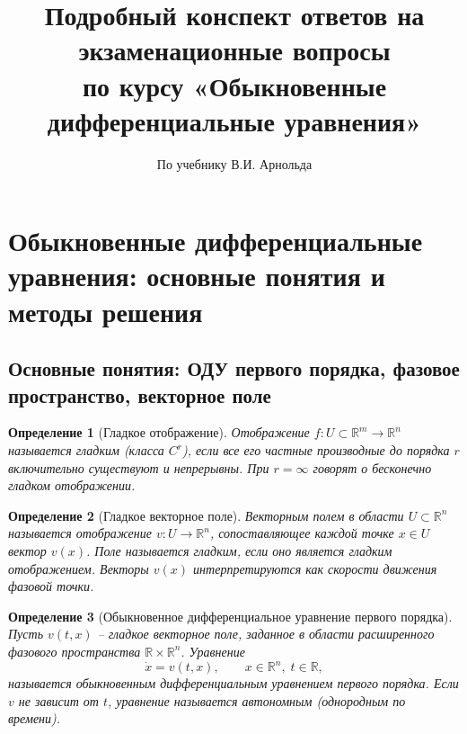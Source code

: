 \documentclass[a4paper,12pt]{article}
\newtheorem{definition}{Определение}
\theoremstyle{definition}
\begin{document}
\title{Подробный конспект ответов на экзаменационные вопросы\\
\large{по курсу «Обыкновенные дифференциальные уравнения»}}
\author{По учебнику В.И. Арнольда}
\date{}
\maketitle

\section{Обыкновенные дифференциальные уравнения: основные понятия и методы решения}

\subsection{Основные понятия: ОДУ первого порядка, фазовое пространство, векторное поле}

\begin{definition}[Гладкое отображение]
	Отображение $f:U\subset\mathbb{R}^m\to\mathbb{R}^n$ называется \emph{гладким} (класса $C^r$), если все его частные производные до порядка $r$ включительно существуют и непрерывны. При $r=\infty$ говорят о бесконечно гладком отображении.
\end{definition}

\begin{definition}[Гладкое векторное поле]
	\emph{Векторным полем} в области $U\subset\mathbb{R}^n$ называется отображение $v:U\to\mathbb{R}^n$, сопоставляющее каждой точке $x\in U$ вектор $v(x)$.
	Поле называется \emph{гладким}, если оно является гладким отображением.
	Векторы $v(x)$ интерпретируются как скорости движения фазовой точки.
\end{definition}

\begin{definition}[Обыкновенное дифференциальное уравнение первого порядка]
	Пусть $v(t,x)$ – гладкое векторное поле, заданное в области расширенного фазового пространства $\mathbb{R}\times\mathbb{R}^n$.
	Уравнение
	\[
	\dot{x}=v(t,x),\qquad x\in\mathbb{R}^n,\; t\in\mathbb{R},
	\]
	называется \emph{обыкновенным дифференциальным уравнением первого порядка}.
	Если $v$ не зависит от $t$, уравнение называется \emph{автономным} (однородным по времени).
\end{definition}
\end{document}
